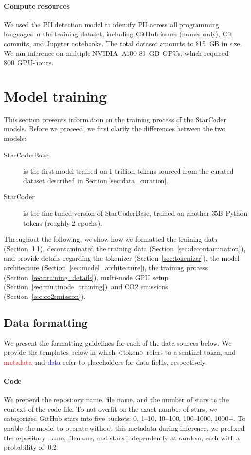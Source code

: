 \documentclass[10pt]{article} %
\begin{document}
\paragraph{Compute resources} We used the PII detection model to identify PII across all programming languages in the training dataset, including GitHub issues (names only), Git commits, and Jupyter notebooks. The total dataset amounts to 815~GB in size. We ran inference on multiple NVIDIA~A100 80~GB~GPUs, which required 800~GPU-hours. 

\section{Model training}\label{sec:model_training}
This section presents information on the training process of the StarCoder models. Before we proceed, we first clarify the differences between the two models:

\begin{description}
\item[StarCoderBase] is the first model trained on 1 trillion tokens sourced from the curated dataset described in Section \ref{sec:data_curation}. 

\item[StarCoder] is the fine-tuned version of StarCoderBase, trained on another 35B Python tokens (roughly 2 epochs).  
\end{description}

Throughout the following, we show how we formatted the training data (Section~\ref{sec:data_formatting}), decontaminated the training data (Section~\ref{sec:decontamination}), and provide details regarding the tokenizer (Section~\ref{sec:tokenizer}), the model architecture (Section~\ref{sec:model_architecture}), the training process (Section~\ref{sec:training_details}),  multi-node GPU setup (Section~\ref{sec:multinode_training}), and CO2 emissions (Section~\ref{sec:co2emission}). 

\subsection{Data formatting}\label{sec:data_formatting}
We present the formatting guidelines for each of the data sources below. We provide the templates below in which <token> refers to a sentinel token, and \textcolor{red}{metadata} and \textcolor{blue}{data} refer to placeholders for data fields, respectively. 

\paragraph{Code} We prepend the repository name, file name, and the number of stars to the context of the code file. To not overfit on the exact number of stars, we categorized GitHub stars into five buckets: 0, 1--10, 10--100, 100--1000, 1000+. To enable the model to operate without this metadata during inference, we prefixed the repository name, filename, and stars independently at random, each with a probability of~$0.2$. 
\end{document}
